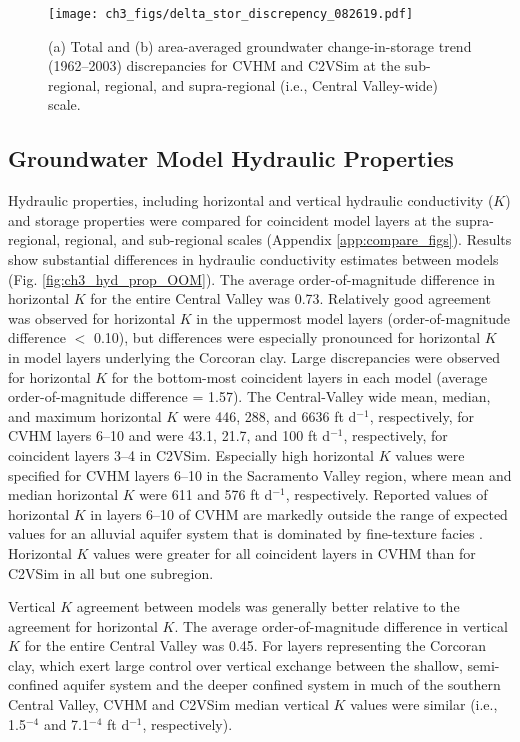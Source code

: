 \begin{figure}[ht!]
\centerline{\texttt{[image: ch3\_figs/delta\_stor\_discrepency\_082619.pdf]}}
\caption{(a) Total and (b) area-averaged groundwater change-in-storage trend (1962--2003) discrepancies for CVHM and C2VSim at the sub-regional, regional, and supra-regional (i.e., Central Valley-wide) scale.}
\label{fig:ch3_GW_delta_stor}
\end{figure}

\subsection{Groundwater Model Hydraulic Properties}

Hydraulic properties, including horizontal and vertical hydraulic conductivity ($K$) and storage properties were compared for coincident model layers at the supra-regional, regional, and sub-regional scales (Appendix \ref{app:compare_figs}). Results show substantial differences in hydraulic conductivity estimates between models (Fig. \ref{fig:ch3_hyd_prop_OOM}). The average order-of-magnitude difference in horizontal $K$ for the entire Central Valley was 0.73. Relatively good agreement was observed for horizontal $K$ in the uppermost model layers (order-of-magnitude difference $<$ 0.10), but differences were especially pronounced for horizontal $K$ in model layers underlying the Corcoran clay. Large discrepancies were observed for horizontal $K$ for the bottom-most coincident layers in each model (average order-of-magnitude difference = 1.57). The Central-Valley wide mean, median, and maximum horizontal $K$ were 446, 288, and 6636 ft d$^{-1}$, respectively, for CVHM layers 6--10 and were 43.1, 21.7, and 100 ft d$^{-1}$, respectively, for coincident layers 3--4 in C2VSim. Especially high horizontal $K$ values were specified for CVHM layers 6--10 in the Sacramento Valley region, where mean and median horizontal $K$ were 611 and 576 ft d$^{-1}$, respectively. Reported values of horizontal $K$ in layers 6--10 of CVHM are markedly outside the range of expected values for an alluvial aquifer system that is dominated by fine-texture facies \citep{anderson2015applied,botros2009spatial,fleckenstein2004managing,frei2009patterns,maserjian1993hydrogeologic,niswonger2008influence,sager2012effects}. Horizontal $K$ values were greater for all coincident layers in CVHM than for C2VSim in all but one subregion. 

Vertical $K$ agreement between models was generally better relative to the agreement for horizontal $K$. The average order-of-magnitude difference in vertical $K$ for the entire Central Valley was 0.45. For layers representing the Corcoran clay, which exert large control over vertical exchange between the shallow, semi-confined aquifer system and the deeper confined system in much of the southern Central Valley, CVHM and C2VSim median vertical $K$ values were similar (i.e., 1.5$^{-4}$ and 7.1$^{-4}$ ft d$^{-1}$, respectively).

